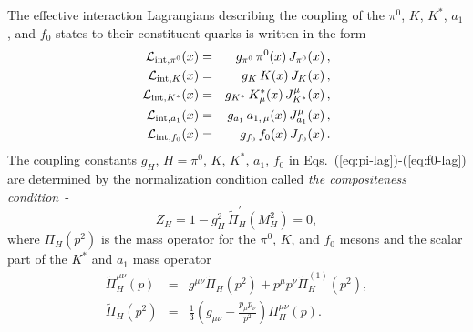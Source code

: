 \documentclass[aps,prd,floatfix,superscriptaddress,showpacs,showkeys]{revtex4}
\newcommand{\bea}{\begin{eqnarray}}
\newcommand{\ena}{\end{eqnarray}}
\newcommand{\be}{\begin{equation}}
\newcommand{\en}{\end{equation}}
\newcommand{\nn}{\nonumber\\}
\begin{document}
The effective interaction Lagrangians describing the coupling of 
the $\pi^0$, $K$, $K^*$, $a_1$, and $f_0$ states 
to their constituent quarks is written in the form
%
\bea
{\cal L}_{ {\rm int}, \pi^0}(x) &=& 
g_{\pi^0}\,\pi^0(x) \, J_{\pi^0}(x)\,, 
\label{eq:pi-lag}\\
{\cal L}_{ {\rm int}, K}(x) &=& 
g_{K}\,K(x) \, J_{K}(x)\,, 
\label{eq:K-lag}\\
{\cal L}_{ {\rm int}, K^*}(x) &=& 
g_{K^*}\,K_\mu^*(x) \, J_{K^*}^\mu(x)\,, 
\label{eq:Kstar-lag}\\
{\cal L}_{ {\rm int}, a_1}(x) &=& 
g_{a_1}\,a_{1,\,\mu}(x)\, J^\mu_{a_1}(x)\,, 
\label{eq:a1-lag}\\     
{\cal L}_{ {\rm int}, f_0}(x) &=& g_{f_0}\, 
f_0(x) \, J_{f_0}(x) 
\label{eq:f0-lag}\,. 
\ena     
The coupling constants $g_{H}$, $H = \pi^0$, $K$, $K^*$, $a_1$, $f_0$ 
in Eqs.~(\ref{eq:pi-lag})-(\ref{eq:f0-lag}) 
are determined by the normalization condition called 
{\it the compositeness condition}~\cite{Weinberg:1962hj}-\cite{Efimov:1993ei} 
\be
\label{eq:Z=0}
Z_{H} = 1-g^2_{H}\,\widetilde\Pi_{H}^\prime(M^2_{H})=0,
\en
where $\Pi_{H}(p^2)$ is the mass operator for the $\pi^0$, $K$, and $f_0$ 
mesons and the scalar part of the $K^*$ and $a_1$ mass 
operator 
\bea
\widetilde\Pi^{\mu\nu}_{H}(p) &=& g^{\mu\nu} \widetilde\Pi_{H}(p^2)
                            + p^\mu p^\nu \widetilde\Pi^{(1)}_{H}(p^2),\nn
\widetilde\Pi_{H}(p^2) &=&
\frac13\left(g_{\mu\nu}-\frac{p_\mu p_\nu}{p^2}\right)\Pi^{\mu\nu}_{H}(p).
\label{eq:mass}
\ena
\end{document}
